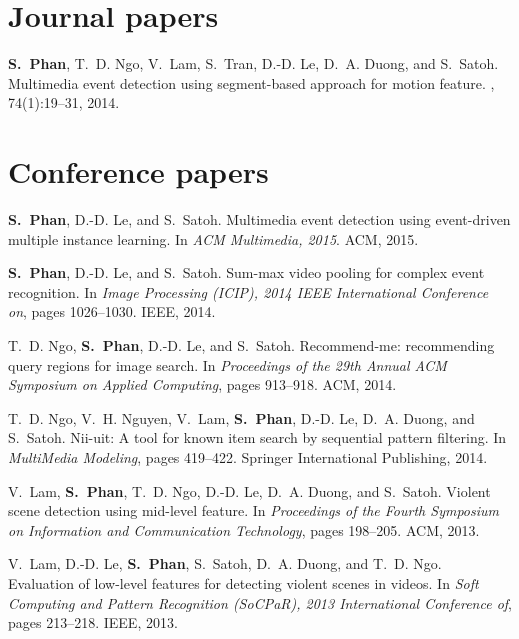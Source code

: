 
\begin{thebibliography}{10}

\section*{Journal papers}

\textbf{S.~Phan}, T.~D. Ngo, V.~Lam, S.~Tran, D.-D. Le, D.~A. Duong, and S.~Satoh.
\newblock Multimedia event detection using segment-based approach for motion
  feature.
, 74(1):19--31, 2014.

\section*{Conference papers}

\textbf{S.~Phan}, D.-D. Le, and S.~Satoh.
\newblock Multimedia event detection using event-driven multiple instance
learning.
\newblock In {\em ACM Multimedia, 2015}. ACM, 2015.

\textbf{S.~Phan}, D.-D. Le, and S.~Satoh.
\newblock Sum-max video pooling for complex event recognition.
\newblock In {\em Image Processing (ICIP), 2014 IEEE International Conference
	on}, pages 1026--1030. IEEE, 2014.

T.~D. Ngo, \textbf{S.~Phan}, D.-D. Le, and S.~Satoh.
\newblock Recommend-me: recommending query regions for image search.
\newblock In {\em Proceedings of the 29th Annual ACM Symposium on Applied
	Computing}, pages 913--918. ACM, 2014.

T.~D. Ngo, V.~H. Nguyen, V.~Lam, \textbf{S.~Phan}, D.-D. Le, D.~A. Duong, and S.~Satoh.
\newblock Nii-uit: A tool for known item search by sequential pattern
filtering.
\newblock In {\em MultiMedia Modeling}, pages 419--422. Springer International
Publishing, 2014.


V.~Lam, \textbf{S.~Phan}, T.~D. Ngo, D.-D. Le, D.~A. Duong, and S.~Satoh.
\newblock Violent scene detection using mid-level feature.
\newblock In {\em Proceedings of the Fourth Symposium on Information and
	Communication Technology}, pages 198--205. ACM, 2013.

V.~Lam, D.-D. Le, \textbf{S.~Phan}, S.~Satoh, D.~A. Duong, and T.~D. Ngo.
\newblock Evaluation of low-level features for detecting violent scenes in
videos.
\newblock In {\em Soft Computing and Pattern Recognition (SoCPaR), 2013
	International Conference of}, pages 213--218. IEEE, 2013.


\end{thebibliography}
